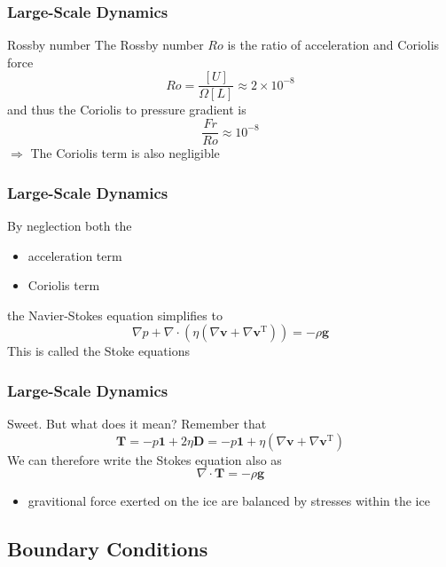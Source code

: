 \documentclass[hide notes,intlimits]{beamer}
\begin{document}
\begin{frame}
  \frametitle{Large-Scale Dynamics}
  \begin{block}{Rossby number}
    The \alert{Rossby number $Ro$} is the ratio of acceleration and Coriolis force
  \begin{equation*}
    Ro = \frac{[U]}{\Omega [L]} \approx 2\times10^{-8}
  \end{equation*}
  and thus the Coriolis to pressure gradient is
  \begin{equation*}
   \frac{Fr}{Ro}\approx 10^{-8}
  \end{equation*}
  $\Rightarrow$ The \alert{Coriolis term} is also \alert{negligible}
  \end{block}
\end{frame}


\begin{frame}
  \frametitle{Large-Scale Dynamics}
  By neglection both the
  \begin{itemize}
    \item acceleration term
    \item Coriolis term
   \end{itemize}
   the Navier-Stokes equation simplifies to
 \begin{equation*}
    \nabla p + \nabla \cdot \left(\eta\left(\nabla \mathbf{v} + \nabla \mathbf{v}^{\text{T}}\right)\right) = - \rho \mathbf{g}
  \end{equation*}
  This is called the \alert{Stoke equations}
\end{frame}


\begin{frame}
  \frametitle{Large-Scale Dynamics}
  Sweet. But what does it mean?
  Remember that 
  \begin{equation*}\mathbf{T} =  -p\mathbf{1} + 2\eta \mathbf{D} = -p\mathbf{1} + \eta\left(\nabla \mathbf{v} + \nabla \mathbf{v}^{\text{T}}\right)
  \end{equation*}
  We can therefore write the Stokes equation also as
 \begin{equation*}
    \nabla \cdot \mathbf{T} = - \rho \mathbf{g}
  \end{equation*}
  \begin{itemize}
    \item gravitional force exerted on the ice are balanced by stresses within the ice
  \end{itemize}
\end{frame}


\subsection{Boundary Conditions}
\end{document}
